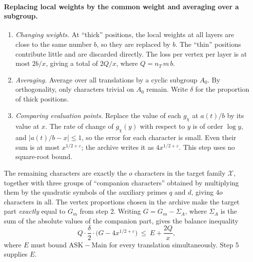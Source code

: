 \documentclass[11pt]{article}
\begin{document}
\paragraph{Replacing local weights by the common weight and averaging over a subgroup.}
\begin{enumerate}
\item \emph{Changing weights.} At ``thick'' positions, the local weights at all layers are close to the same number $b$, so they are replaced by $b$. The ``thin'' positions contribute little and are discarded directly. The loss per vertex per layer is at most $2b/x$, giving a total of $2Q/x$, where $Q=n_T\,m\,b$.
\item \emph{Averaging.} Average over all translations by a cyclic subgroup $A_0$. By orthogonality, only characters trivial on $A_0$ remain. Write $\delta$ for the proportion of thick positions.
\item \emph{Comparing evaluation points.} Replace the value of each $g_\chi$ at $a(t)/b$ by its value at $x$. The rate of change of $g_\chi(y)$ with respect to $y$ is of order $\log y$, and $|a(t)/b-x|\le1$, so the error for each character is small. Even their sum is at most $x^{1/2+\varepsilon}$; the archive writes it as $4x^{1/2+\varepsilon}$. This step uses no square-root bound.
\end{enumerate}
The remaining characters are exactly the $o$ characters in the target family $\mathcal X$, together with three groups of ``companion characters'' obtained by multiplying them by the quadratic symbols of the auxiliary primes $q$ and $d$, giving $4o$ characters in all. The vertex proportions chosen in the archive make the target part \emph{exactly} equal to $G_m$ from step 2. Writing $G=G_m-\Sigma_A$, where $\Sigma_A$ is the sum of the absolute values of the companion part, gives the balance inequality
\[
Q\cdot\frac\delta2\cdot\bigl(G-4x^{1/2+\varepsilon}\bigr)\ \le\ E+\frac{2Q}{x},
\]
where $E$ must bound $\mathrm{ASK}-\mathrm{Main}$ for every translation simultaneously. Step 5 supplies $E$.
\end{document}

